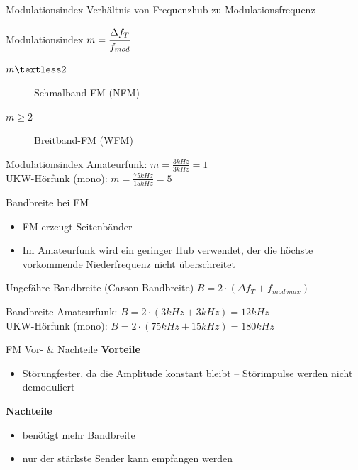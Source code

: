 \begin{frame}{Modulationsindex}
  Verhältnis von Frequenzhub zu Modulationsfrequenz
  \begin{block}{Modulationsindex}
    $m = \cfrac{\Delta f_T}{f_{mod}}$
  \end{block}
  \begin{description}
    \item[$m\textless2$] Schmalband-FM (NFM)
    \item[$m\geq$2] Breitband-FM (WFM)
  \end{description}
  \begin{exampleblock}{Modulationsindex}
    Amateurfunk: $m = \frac{3kHz}{3kHz} = 1$\\
    UKW-Hörfunk (mono): $m = \frac{75kHz}{15kHz} = 5$\\
  \end{exampleblock}
\end{frame}

\begin{frame}{Bandbreite bei FM}
  \begin{itemize}
    \item FM erzeugt Seitenbänder
    \item Im Amateurfunk wird ein geringer Hub verwendet, der die höchste vorkommende Niederfrequenz nicht überschreitet
  \end{itemize}
  \begin{block}{Ungefähre Bandbreite (Carson Bandbreite)}
    $B = 2 \cdot (\Delta f_T + f_{mod~max})$
  \end{block}
  \begin{exampleblock}{Bandbreite}
    Amateurfunk: $B =2 \cdot (3kHz + 3kHz) = 12kHz$\\
    UKW-Hörfunk (mono): $B = 2 \cdot (75kHz + 15kHz) = 180kHz$
  \end{exampleblock}
\end{frame}

\begin{frame}{FM Vor- \& Nachteile}
  \textbf{\Large{Vorteile}}
  \begin{itemize}
    \item Störungfester, da die Amplitude konstant bleibt -- Störimpulse werden
      nicht demoduliert
  \end{itemize}
  \vspace{1cm}
  \textbf{\Large{Nachteile}}
  \begin{itemize}
    \item benötigt mehr Bandbreite
    \item nur der stärkste Sender kann empfangen werden
  \end{itemize}
\end{frame}

